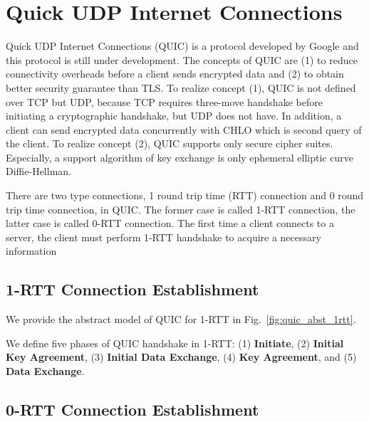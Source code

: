 \section{Quick UDP Internet Connections} \label{sec:quic}

Quick UDP Internet Connections (QUIC) is a protocol
developed by Google and this protocol is still under
development.
The concepts of QUIC are (1) to reduce connectivity
overheads before a client sends encrypted data and
(2) to obtain better security guarantee than TLS.
To realize concept (1), QUIC is not defined over
TCP but UDP, because TCP requires three-move handshake
before initiating a cryptographic handshake, but UDP
does not have. In addition, a client can send encrypted
data concurrently with CHLO which is second query of the
client.
To realize concept (2), QUIC supports only secure cipher
suites. Especially, a support algorithm of key exchange
is only ephemeral elliptic curve Diffie-Hellman.

There are two type connections, 1 round trip time (RTT)
connection and 0 round trip time connection, in QUIC.
The former case is called 1-RTT connection, the latter
case is called 0-RTT connection.
The first time a client connects to a server, the client
must perform 1-RTT handshake to acquire a necessary
information

\subsection{1-RTT Connection Establishment} \label{sec:quic_1rtt}

We provide the abstract model of QUIC for 1-RTT in
Fig.~\ref{fig:quic_abst_1rtt}.
%

%
We define five phases of QUIC handshake in 1-RTT:
(1) \textbf{Initiate},
(2) \textbf{Initial Key Agreement},
(3) \textbf{Initial Data Exchange},
(4) \textbf{Key Agreement}, and
(5) \textbf{Data Exchange}.







\subsection{0-RTT Connection Establishment} \label{sec:quic_0rtt}

